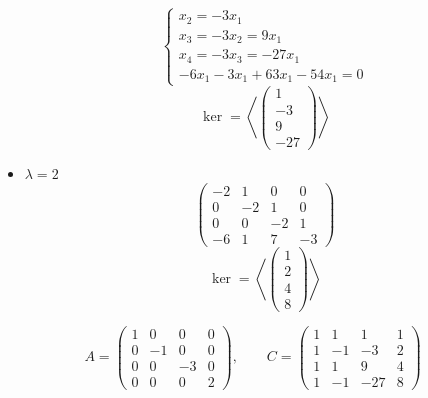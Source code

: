 \begin{itemize}
$$\begin{cases}
    	x_2 = -3x_1 \\
        x_3 = -3x_2 = 9x_1 \\
        x_4 = -3x_3 = -27x_1 \\
        -6x_1 - 3x_1 + 63x_1 - 54x_1 = 0
    \end{cases} $$
    $$ \ker = \left\langle
    \begin{pmatrix}
    	1 \\
        -3 \\
        9 \\
        -27
    \end{pmatrix} \right\rangle $$
    \item $ \lambda = 2 $
    $$
    \begin{pmatrix}
    	-2 & 1 & 0 & 0 \\
        0 & -2 & 1 & 0 \\
        0 & 0 & -2 & 1 \\
        -6 & 1 & 7 & -3
    \end{pmatrix} $$
    $$ \ker = \left\langle
    \begin{pmatrix}
    	1 \\
        2 \\
        4 \\
        8
    \end{pmatrix} \right\rangle $$
\end{itemize}
$$ A =
\begin{pmatrix}
	1 & 0 & 0 & 0 \\
    0 & -1 & 0 & 0 \\
    0 & 0 & -3 & 0 \\
    0 & 0 & 0 & 2
\end{pmatrix}, \qquad C =
\begin{pmatrix}
	1 & 1 & 1 & 1 \\
    1 & -1 & -3 & 2 \\
    1 & 1 & 9 & 4 \\
    1 & -1 & -27 & 8
\end{pmatrix} $$

\section{}

